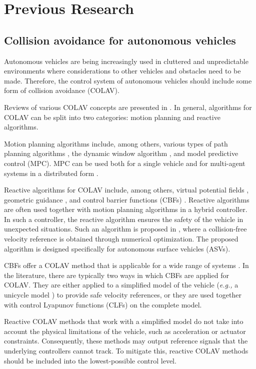 \section{Previous Research}

\subsection{Collision avoidance for autonomous vehicles}
Autonomous vehicles are being increasingly used in cluttered and unpredictable environments where considerations to other vehicles and obstacles need to be made. 
Therefore, the control system of autonomous vehicles should include some form of collision avoidance (COLAV).

Reviews of various COLAV concepts are presented in \cite{statheros_autonomous_2008,tam_review_2009,hoy_algorithms_2015}.
In general, algorithms for COLAV can be split into two categories: motion planning and reactive algorithms.

Motion planning algorithms include, among others, various types of path planning algorithms \cite{wang_ship_2017,kuwata_safe_2014,lazarowska_ships_2015}, the dynamic window algorithm \cite{fox_dynamic_1997}, and model predictive control (MPC).
MPC can be used both for a single vehicle \cite{hagen_mpc-based_2018,sun_collision_2018} and for multi-agent systems in a distributed form \cite{kuriki_formation_2015,dai_distributed_2017}.

Reactive algorithms for COLAV include, among others, virtual potential fields \cite{roussos_3d_2008}, geometric guidance \cite{mujumdar_reactive_2011}, and control barrier functions (CBFs) \cite{squires_constructive_2018,igarashi_collision_2018,romdlony_stabilization_2016,basso_safety-critical_2020,ames_control_2014}.
Reactive algorithms are often used together with motion planning algorithms in a hybrid controller.
In such a controller, the reactive algorithm ensures the safety of the vehicle in unexpected situations.
Such an algorithm is proposed in \cite{hedjar_automatic_2019}, where a collision-free velocity reference is obtained through numerical optimization.
The proposed algorithm is designed specifically for autonomous surface vehicles (ASVs).

CBFs offer a COLAV method that is applicable for a wide range of systems \cite{ames_control_2019}.
In the literature, there are typically two ways in which CBFs are applied for COLAV.
They are either applied to a simplified model of the vehicle (\emph{e.g.,} a unicycle model \cite{squires_constructive_2018,igarashi_collision_2018}) to provide safe velocity references, or they are used together with control Lyapunov functions (CLFs) \cite{romdlony_stabilization_2016,basso_safety-critical_2020,ames_control_2014} on the complete model.

Reactive COLAV methods that work with a simplified model do not take into account the physical limitations of the vehicle, such as acceleration or actuator constraints.
Consequently, these methods may output reference signals that the underlying controllers cannot track.
To mitigate this, reactive COLAV methods should be included into the lowest-possible control level.
